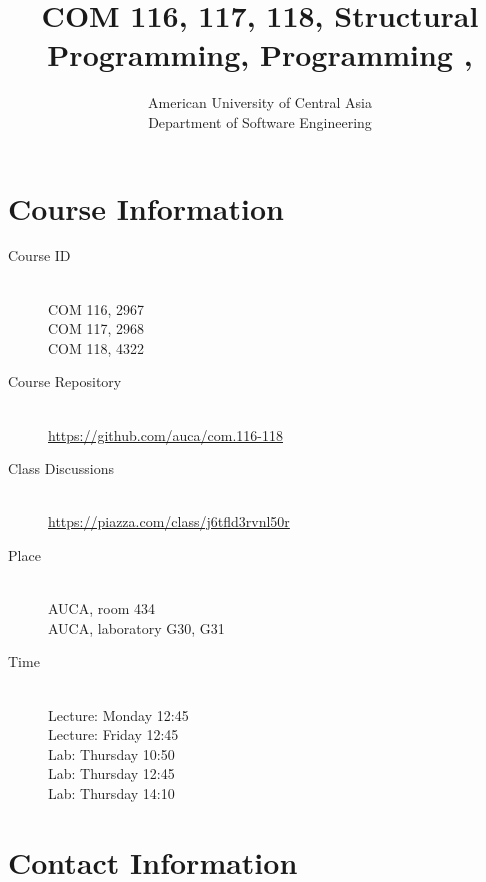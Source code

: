 \documentclass[12pt,a4paper,oneside]{article}
\newcommand{\R}[1]{\uppercase\expandafter{\romannumeral #1\relax}}
\begin{document}
    \title{COM 116, 117, 118, Structural Programming, Programming \R{1}, \R{2}}
    \author{
        American University of Central Asia\\
        Department of Software Engineering
    }
    \date{}
    \maketitle

    \section{Course Information}

        \begin{description}
            \item[Course ID]\hfill\\
                COM 116, 2967\\
                COM 117, 2968\\
                COM 118, 4322
            \item[Course Repository]\hfill\\
                \url{https://github.com/auca/com.116-118}
            \item[Class Discussions]\hfill\\
                \url{https://piazza.com/class/j6tfld3rvnl50r}
            \item[Place]\hfill\\
                AUCA, room 434\\
                AUCA, laboratory G30, G31
            \item[Time]\hfill\\
                Lecture: Monday 12:45\\
                Lecture: Friday 12:45\\
                Lab: Thursday 10:50\\
                Lab: Thursday 12:45\\
                Lab: Thursday 14:10
        \end{description}

    \section{Contact Information}
\end{document}

